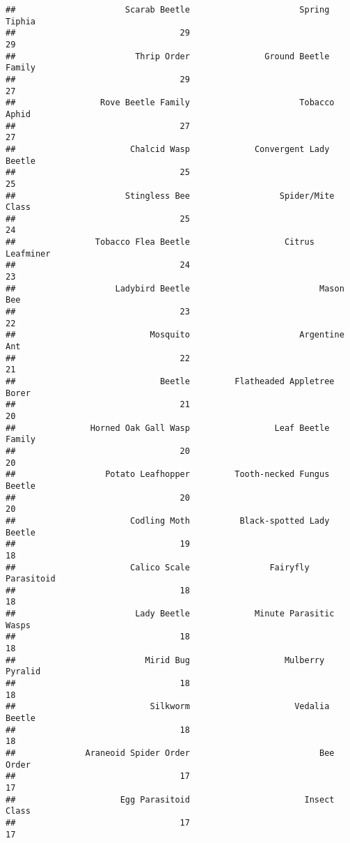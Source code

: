 \documentclass[]{article}
\begin{document}
\begin{verbatim}
##                      Scarab Beetle                      Spring Tiphia 
##                                 29                                 29 
##                        Thrip Order               Ground Beetle Family 
##                                 29                                 27 
##                 Rove Beetle Family                      Tobacco Aphid 
##                                 27                                 27 
##                       Chalcid Wasp             Convergent Lady Beetle 
##                                 25                                 25 
##                      Stingless Bee                  Spider/Mite Class 
##                                 25                                 24 
##                Tobacco Flea Beetle                   Citrus Leafminer 
##                                 24                                 23 
##                    Ladybird Beetle                          Mason Bee 
##                                 23                                 22 
##                           Mosquito                      Argentine Ant 
##                                 22                                 21 
##                             Beetle         Flatheaded Appletree Borer 
##                                 21                                 20 
##               Horned Oak Gall Wasp                 Leaf Beetle Family 
##                                 20                                 20 
##                  Potato Leafhopper         Tooth-necked Fungus Beetle 
##                                 20                                 20 
##                       Codling Moth          Black-spotted Lady Beetle 
##                                 19                                 18 
##                       Calico Scale                Fairyfly Parasitoid 
##                                 18                                 18 
##                        Lady Beetle             Minute Parasitic Wasps 
##                                 18                                 18 
##                          Mirid Bug                   Mulberry Pyralid 
##                                 18                                 18 
##                           Silkworm                     Vedalia Beetle 
##                                 18                                 18 
##              Araneoid Spider Order                          Bee Order 
##                                 17                                 17 
##                     Egg Parasitoid                       Insect Class 
##                                 17                                 17 

\end{verbatim}
\end{document}
